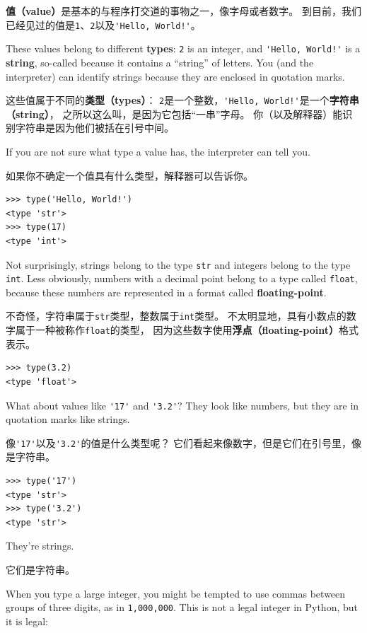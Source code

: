\documentclass[10pt]{book}
\begin{document}
\begin{CJK}{UTF8}{gbsn}
{\bf 值（value）}是基本的与程序打交道的事物之一，像字母或者数字。
到目前，我们已经见过的值是{\tt 1}、{\tt 2}以及\verb"'Hello, World!'"。

These values belong to different {\bf types}:
{\tt 2} is an integer, and \verb"'Hello, World!'" is a {\bf string},
so-called because it contains a ``string'' of letters.
You (and the interpreter) can identify
strings because they are enclosed in quotation marks.

这些值属于不同的{\bf 类型（types）}：
{\tt 2}是一个整数，\verb"'Hello, World!'"是一个{\bf 字符串（string）}，
之所以这么叫，是因为它包括``一串''字母。
你（以及解释器）能识别字符串是因为他们被括在引号中间。

If you are not sure what type a value has, the interpreter can tell you.

如果你不确定一个值具有什么类型，解释器可以告诉你。

\begin{verbatim}
>>> type('Hello, World!')
<type 'str'>
>>> type(17)
<type 'int'>
\end{verbatim}
%
Not surprisingly, strings belong to the type {\tt str} and
integers belong to the type {\tt int}.  Less obviously, numbers
with a decimal point belong to a type called {\tt float},
because these numbers are represented in a
format called {\bf floating-point}.

不奇怪，字符串属于{\tt str}类型，整数属于{\tt int}类型。
不太明显地，具有小数点的数字属于一种被称作{\tt float}的类型，
因为这些数字使用{\bf 浮点（floating-point）}格式表示。

\begin{verbatim}
>>> type(3.2)
<type 'float'>
\end{verbatim}
%
What about values like \verb"'17'" and \verb"'3.2'"?
They look like numbers, but they are in quotation marks like
strings.

像\verb"'17'"以及\verb"'3.2'"的值是什么类型呢？
它们看起来像数字，但是它们在引号里，像是字符串。

\begin{verbatim}
>>> type('17')
<type 'str'>
>>> type('3.2')
<type 'str'>
\end{verbatim}
%
They're strings.

它们是字符串。

When you type a large integer, you might be tempted to use commas
between groups of three digits, as in {\tt 1,000,000}.  This is not a
legal integer in Python, but it is legal:


\end{CJK}
\end{document}
